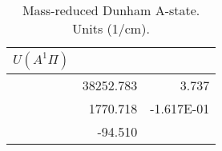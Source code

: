 \begin{table}[h]
\begin{tabular}{crr}
\toprule
$U (A^1\Pi)$\\ \midrule 
& 38252.783 & 3.737 \\
& 1770.718 & -1.617E-01 \\
& -94.510 \\
\bottomrule
\end{tabular}\caption{Mass-reduced Dunham A-state. Units (1/cm).}\end{table}
